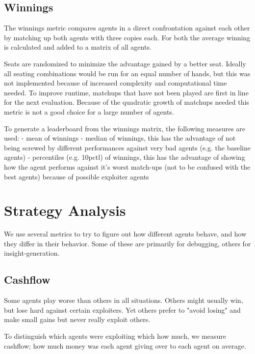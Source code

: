 \subsection{Winnings}
The winnings metric compares agents in a direct confrontation against each other by matching up both agents with three copies each. For both the average winning is calculated and added to a matrix of all agents.

Seats are randomized to minimize the advantage gained by a better seat. Ideally all seating combinations would be run for an equal number of hands, but this was not implemented because of increased complexity and computational time needed.  To improve runtime, matchups that have not been played are first in line for the next evaluation. Because of the quadratic growth of matchups needed this metric is not a good choice for a large number of agents.

To generate a leaderboard from the winnings matrix, the following measures are used:
- mean of winnings
- median of winnings, this has the advantage of not being screwed by different performances against very bad agents (e.g. the baseline agents)
- percentiles (e.g. 10pctl) of winnings, this has the advantage of showing how the agent performs against it's worst match-ups (not to be confused with the best agents) because of possible exploiter agents


\section{Strategy Analysis}

We use several metrics to try to figure out how different agents behave, and how they differ in their behavior. Some of these are primarily for debugging, others for insight-generation.

\subsection{Cashflow}

Some agents play worse than others in all situations. Others might usually win, but lose hard against certain exploiters. Yet others prefer to "avoid losing" and make small gains but never really exploit others.

To distinguish which agents were exploiting which how much, we measure cashflow; how much money was each agent giving over to each agent on average.

